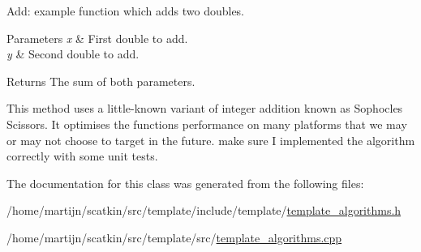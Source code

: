 Add\+: example function which adds two doubles. 


\begin{DoxyParams}{Parameters}
{\em x} & First double to add. \\
\hline
{\em y} & Second double to add. \\
\hline
\end{DoxyParams}
\begin{DoxyReturn}{Returns}
The sum of both parameters.
\end{DoxyReturn}
This method uses a little-\/known variant of integer addition known as Sophocles\textquotesingle{} Scissors. It optimises the function\textquotesingle{}s performance on many platforms that we may or may not choose to target in the future.  make sure I implemented the algorithm correctly with some unit tests. 

The documentation for this class was generated from the following files\+:\begin{DoxyCompactItemize}
\item 
/home/martijn/scatkin/src/template/include/template/\hyperlink{template__algorithms_8h}{template\+\_\+algorithms.\+h}\item 
/home/martijn/scatkin/src/template/src/\hyperlink{template__algorithms_8cpp}{template\+\_\+algorithms.\+cpp}\end{DoxyCompactItemize}

